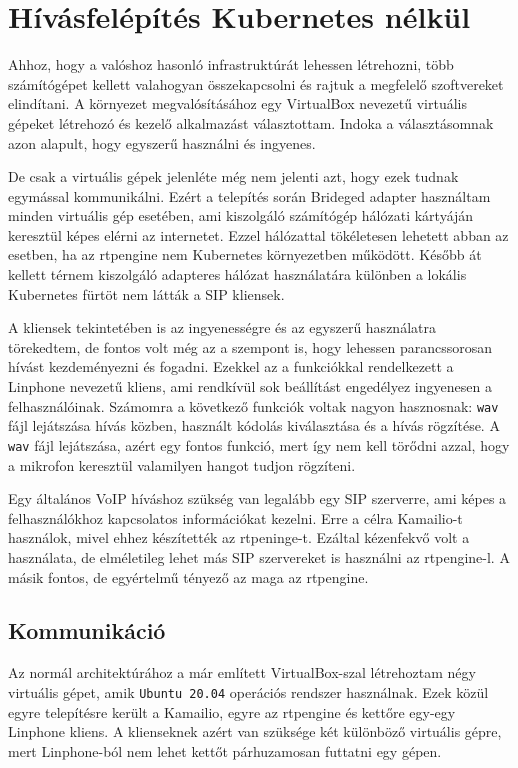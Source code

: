 \section{Hívásfelépítés Kubernetes nélkül}

Ahhoz, hogy a valóshoz hasonló infrastruktúrát lehessen létrehozni, több 
számítógépet kellett valahogyan összekapcsolni és rajtuk a megfelelő szoftvereket
elindítani. A környezet megvalósításához egy VirtualBox nevezetű virtuális gépeket
létrehozó és kezelő alkalmazást választottam. Indoka a választásomnak azon
alapult, hogy egyszerű használni és ingyenes.

De csak a virtuális gépek jelenléte még nem jelenti azt, hogy ezek tudnak egymással 
kommunikálni. Ezért a telepítés során Brideged adapter használtam minden virtuális gép 
esetében, ami kiszolgáló számítógép hálózati kártyáján keresztül képes elérni az 
internetet. Ezzel hálózattal tökéletesen lehetett abban az esetben, ha az rtpengine nem 
Kubernetes környezetben működött. Később át kellett térnem kiszolgáló adapteres hálózat 
használatára különben a lokális Kubernetes fürtöt nem látták a SIP kliensek. 

A kliensek tekintetében is az ingyenességre és az egyszerű használatra törekedtem, 
de fontos volt még az a szempont is, hogy lehessen parancssorosan hívást kezdeményezni
és fogadni. Ezekkel az a funkciókkal rendelkezett a Linphone nevezetű kliens, ami
rendkívül sok beállítást engedélyez ingyenesen a felhasználóinak. Számomra a következő
funkciók voltak nagyon hasznosnak: \texttt{wav} fájl lejátszása hívás közben, használt 
kódolás kiválasztása és a hívás rögzítése. A \texttt{wav} fájl lejátszása, azért egy 
fontos funkció, mert így nem kell törődni azzal, hogy a mikrofon keresztül valamilyen 
hangot tudjon rögzíteni.

Egy általános VoIP híváshoz szükség van legalább egy SIP szerverre, ami képes a 
felhasználókhoz kapcsolatos információkat kezelni. Erre a célra Kamailio-t használok, 
mivel ehhez készítették az rtpeninge-t. Ezáltal kézenfekvő volt a használata, de 
elméletileg lehet más SIP szervereket is használni az rtpengine-l. A másik fontos, de 
egyértelmű tényező az maga az rtpengine.

\subsection{Kommunikáció}

Az normál architektúrához a már említett VirtualBox-szal létrehoztam négy virtuális gépet,
amik \texttt{Ubuntu 20.04} operációs rendszer használnak. Ezek közül egyre telepítésre 
került a Kamailio, egyre az rtpengine és kettőre egy-egy Linphone kliens. A klienseknek 
azért van szüksége két különböző virtuális gépre, mert Linphone-ból nem lehet kettőt
párhuzamosan futtatni egy gépen.

